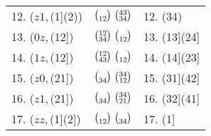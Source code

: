 \documentclass{surv-l}
\numberwithin{equation}{section}
\numberwithin{table}{section}
\numberwithin{figure}{section}
\theoremstyle{definition}
\begin{document}
\begin{table}
{\begin{tabular}{@{}|l|l|l|@{}}
12. ($z1$,\,(1](2)) &$\big(\!\begin{smallmatrix}\vphantom{34}\\ 12\end{smallmatrix}\!\big)\ \big(\!\begin{smallmatrix}43 \\ 34\end{smallmatrix}\!\big)$ &12. (34) \\[3pt]
13. ($0z$,\,(12]) &$\big(\!\begin{smallmatrix}12 \\ 34\end{smallmatrix}\!\big)\ \big(\!\begin{smallmatrix}\vphantom{34}\\ 12\end{smallmatrix}\!\big)$ &13. (13](24] \\[3pt]
14. ($1z$,\,(12]) &$\big(\!\begin{smallmatrix}12 \\ 43\end{smallmatrix}\!\big)\ \big(\!\begin{smallmatrix}\vphantom{34}\\ 12\end{smallmatrix}\!\big)$ &14. (14](23] \\[3pt]
15. ($z0$,\,(21]) &$\big(\!\begin{smallmatrix}\vphantom{34}\\ 34\end{smallmatrix}\!\big)\ \big(\!\begin{smallmatrix}34 \\ 12\end{smallmatrix}\!\big)$ &15. (31](42] \\[3pt]
16. ($z1$,\,(21]) &$\big(\!\begin{smallmatrix}\vphantom{34}\\ 34\end{smallmatrix}\!\big)\ \big(\!\begin{smallmatrix}34 \\ 21\end{smallmatrix}\!\big)$ &16. (32](41] \\[3pt]
17. ($zz$,\,(1](2]) &$\big(\!\begin{smallmatrix}\vphantom{34}\\ 12\end{smallmatrix}\!\big)\ \big(\!\begin{smallmatrix}\vphantom{34}\\ 34\end{smallmatrix}\!\big)$ &17. (1] \\[3pt]
\hline
\end{tabular}}{}
\end{table}
\end{document}
